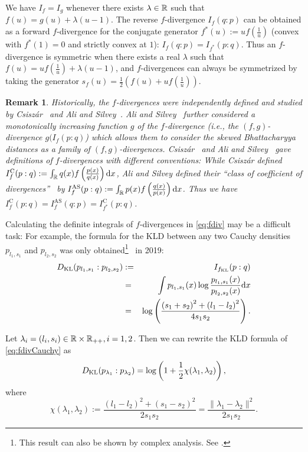\documentclass[journal]{IEEEtran}
\newtheorem{remark}[theorem]{Remark}
\begin{document}
We have $I_f=I_g$ whenever there exists $\lambda\in{\mathbb{R}}$ such that $f(u)=g(u)+\lambda(u-1)$.
The reverse $f$-divergence $I_f(q:p)$ can be obtained as a forward $f$-divergence for the conjugate generator $f^*(u):=uf\left(\frac{1}{u}\right)$ (convex with $f^*(1)=0$ and strictly convex at $1$): $I_f(q:p)=I_{f^*}(p:q)$. 
Thus an $f$-divergence is symmetric when there exists a real $\lambda$ such that $f(u)=uf\left(\frac{1}{u}\right)+\lambda(u-1)$, and $f$-divergences can always be symmetrized by taking the generator 
$s_f(u)=\frac{1}{2}(f(u)+uf\left(\frac{1}{u}\right))$.

\begin{remark}
Historically, the $f$-divergences were independently defined and studied by Csisz\'ar~\cite{Csiszar-1967} and Ali and Silvey~\cite{fdiv-AliSilvey-1966}.
Ali and Silvey~\cite{fdiv-AliSilvey-1966} further considered a monotonically increasing function $g$ of the $f$-divergence (i.e., the $(f,g)$-divergence $g(I_f(p:q)$) which allows them
to consider the skewed Bhattacharyya distances as a family of $(f,g)$-divergences.  
Csisz\'ar~\cite{Csiszar-1967} and Ali and Silvey~\cite{fdiv-AliSilvey-1966} gave definitions of $f$-divergences with different conventions:
While Csisz\'ar defined $I_f^{\mathrm{C}}(p:q) :=\int_{{\mathbb{R}}} q(x) f\left(\frac{p(x)}{q(x)}\right) \mathrm{d}x$, Ali and Silvey defined their ``class of coefficient of divergences''~\cite{fdiv-AliSilvey-1966} by
$I_f^{\mathrm{AS}}(p:q) :=\int_{{\mathbb{R}}} p(x) f\left(\frac{q(x)}{p(x)}\right) \mathrm{d}x$. Thus we have 
$I_f^{\mathrm{C}}(p:q) =I_f^{\mathrm{AS}}(q:p)=I_{f^*}^{\mathrm{C}}(p:q)$.
\end{remark}

Calculating the definite integrals of $f$-divergences in \eqref{eq:fdiv} may be a difficult task:
For example, the formula for the KLD between any two Cauchy densities $p_{l_1,s_1}$ and $p_{l_2,s_2}$ was only obtained\footnote{This result can also be shown by complex analysis. See \cite{Nielsen2021f}.}~\cite{KLCauchy-2019} in 2019:
\begin{eqnarray}\label{eq:fdivCauchy}
D_\KL(p_{l_1,s_1}:p_{l_2,s_2}) &:=& I_{f_\KL}(p:q)\notag\\
&=& \int p_{l_1,s_1}(x)\log\frac{p_{l_1,s_1}(x)}{p_{l_2,s_2}(x)}\dx \\
&=& \log\left( \frac{\left(s_{1}+s_{2}\right)^{2}+\left(l_{1}-l_{2}\right)^{2}}{4 s_{1} s_{2}}\right). \notag
\end{eqnarray}

Let $\lambda_i =(l_i,s_i)\in {\mathbb{R}}\times {\mathbb{R}}_{++}, i = 1,2$. 
Then we can rewrite the KLD formula of \eqref{eq:fdivCauchy} as
\begin{equation*}
D_{\mathrm{KL}}(p_{\lambda_1}:p_{\lambda_2}) = \log \left( 1+ \frac{1}{2}\chi(\lambda_1,\lambda_2)\right),
\end{equation*}
where
\begin{equation}\label{eq:chisqrCauchy}
\chi(\lambda_1,\lambda_2):=\frac{(l_1-l_2)^2+(s_1-s_2)^2}{2s_1 s_2}=\frac{\|\lambda_1-\lambda_2\|^2}{2s_1s_2}. 
\end{equation}
\end{document}
